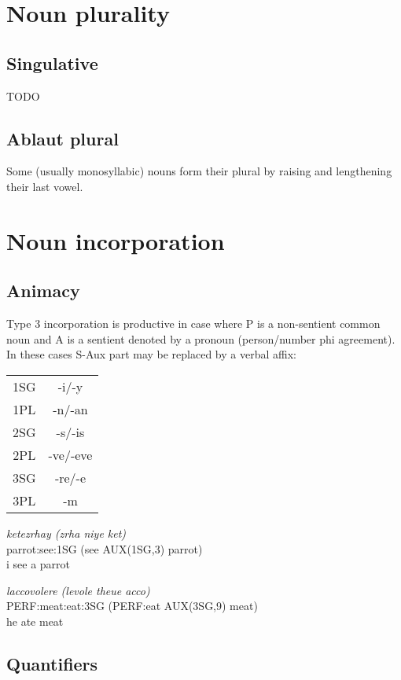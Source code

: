 \documentclass[8pt]{book}
\begin{document}
\section{Noun plurality}
\subsection{Singulative}
TODO

\subsection{Ablaut plural}
Some (usually monosyllabic) nouns form their plural by raising and lengthening their last vowel.



\section{Noun incorporation}

\subsection{Animacy}
Type 3 incorporation is productive in case where P is a non-sentient common noun and A is a sentient denoted by a pronoun (person/number phi agreement). In these cases S-Aux part may be replaced by a verbal affix:

\begin{tabular}{c | c}
  1SG & -i/-y \\
  1PL & -n/-an \\
  2SG & -s/-is \\
  2PL & -ve/-eve \\
  3SG & -re/-e \\
  3PL & -m \\
\end{tabular}

\begin{exe}
\ex 
\gll \textit{ketezrhay (zrha niye ket)} \\
  parrot:see:1SG (see AUX(1SG,3) parrot) \\
\trans i see a parrot

\ex 
\gll \textit{laccovolere (levole theue acco)} \\
  PERF:meat:eat:3SG (PERF:eat AUX(3SG,9) meat) \\
\trans he ate meat
\end{exe}

\subsection{Quantifiers}
\end{document}
